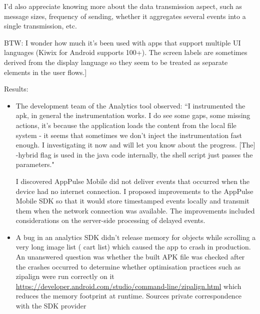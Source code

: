 I'd also appreciate knowing more about the data transmission aspect, such as message sizes, frequency of sending, whether it aggregates several events into a single transmission, etc.

BTW: I wonder how much it's been used with apps that support multiple UI languages (Kiwix for Android supports 100+). The screen labels are sometimes derived from the display language so they seem to be treated as separate elements in the user flows.]

Results:
\begin{itemize}
    \item The development team of the Analytics tool observed: ``I instrumented the apk, in general the instrumentation works. I do see some gaps, some missing actions, it’s because the application loads the content from the local file system - it seems that sometimes we don’t inject the instrumentation fast enough. I investigating it now and will let you know about the progress. [The] -hybrid flag is used in the java code internally, the shell script just passes the parameters." %
    \item [I discovered] AppPulse Mobile did not deliver events that occurred when the device had no internet connection. I proposed improvements to the AppPulse Mobile SDK so that it would store timestamped events locally and transmit them when the network connection was available. The improvements included considerations on the server-side processing of delayed events. %
    \item A bug in an analytics SDK didn't release memory for objects while scrolling a very long image list ( cart list) which caused the app to crash in production. An unanswered question was whether the built APK file was checked after the crashes occurred to determine whether optimisation practices such as zipalign were run correctly on it \url{https://developer.android.com/studio/command-line/zipalign.html} which reduces the memory footprint at runtime. Sources private correspondence with the SDK provider %
\end{itemize}

